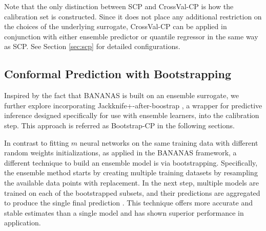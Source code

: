 \documentclass[a4paper,oneside,bibliography=totoc]{scrbook}
\begin{document}
Note that the only distinction between SCP and CrossVal-CP is how the calibration set is constructed. Since it does not place any additional restriction on the choices of the underlying surrogate, CrossVal-CP can be applied in conjunction with either ensemble predictor or quantile regressor in the same way as SCP. See Section \ref{sec:scp} for detailed configurations.

\subsection{Conformal Prediction with Bootstrapping}
Inspired by the fact that BANANAS is built on an ensemble surrogate, we further explore incorporating Jackknife+-after-boostrap \cite{kim2020predictive}, a wrapper for predictive inference designed specifically for use with ensemble learners, into the calibration step. This approach is referred as Bootstrap-CP in the following sections.

In contrast to fitting $m$ neural networks on the same training data with different random weights initializations, as applied in the BANANAS framework, a different technique to build an ensemble model is via bootstrapping. Specifically, the ensemble method starts by creating multiple training datasets by resampling the available data points with replacement. In the next step, multiple models are trained on each of the bootstrapped subsets, and their predictions are aggregated to produce the single final prediction \cite{breiman96}. This technique offers more accurate and stable estimates than a single model and has shown superior performance in application.
\end{document}
